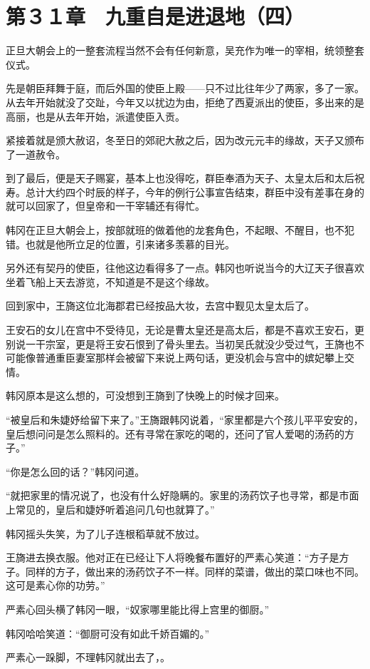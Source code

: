 \section{第３１章　九重自是进退地（四）}

正旦大朝会上的一整套流程当然不会有任何新意，吴充作为唯一的宰相，统领整套仪式。

先是朝臣拜舞于庭，而后外国的使臣上殿——只不过比往年少了两家，多了一家。从去年开始就没了交趾，今年又以扰边为由，拒绝了西夏派出的使臣，多出来的是高丽，也是从去年开始，派遣使臣入贡。

紧接着就是颁大赦诏，冬至日的郊祀大赦之后，因为改元元丰的缘故，天子又颁布了一道赦令。

到了最后，便是天子赐宴，基本上也没得吃，群臣奉酒为天子、太皇太后和太后祝寿。总计大约四个时辰的样子，今年的例行公事宣告结束，群臣中没有差事在身的就可以回家了，但皇帝和一干宰辅还有得忙。

韩冈在正旦大朝会上，按部就班的做着他的龙套角色，不起眼、不醒目，也不犯错。也就是他所立足的位置，引来诸多羡慕的目光。

另外还有契丹的使臣，往他这边看得多了一点。韩冈也听说当今的大辽天子很喜欢坐着飞船上天去游览，不知道是不是这个缘故。

回到家中，王旖这位北海郡君已经按品大妆，去宫中觐见太皇太后了。

王安石的女儿在宫中不受待见，无论是曹太皇还是高太后，都是不喜欢王安石，更别说一干宗室，更是将王安石恨到了骨头里去。当初吴氏就没少受过气，王旖也不可能像普通重臣妻室那样会被留下来说上两句话，更没机会与宫中的嫔妃攀上交情。

韩冈原本是这么想的，可没想到王旖到了快晚上的时候才回来。

“被皇后和朱婕妤给留下来了。”王旖跟韩冈说着，“家里都是六个孩儿平平安安的，皇后想问问是怎么照料的。还有寻常在家吃的喝的，还问了官人爱喝的汤药的方子。”

“你是怎么回的话？”韩冈问道。

“就把家里的情况说了，也没有什么好隐瞒的。家里的汤药饮子也寻常，都是市面上常见的，皇后和婕妤听着追问几句也就算了。”

韩冈摇头失笑，为了儿子连根稻草就不放过。

王旖进去换衣服。他对正在已经让下人将晚餐布置好的严素心笑道：“方子是方子。同样的方子，做出来的汤药饮子不一样。同样的菜谱，做出的菜口味也不同。这可是素心你的功劳。”

严素心回头横了韩冈一眼，“奴家哪里能比得上宫里的御厨。”

韩冈哈哈笑道：“御厨可没有如此千娇百媚的。”

严素心一跺脚，不理韩冈就出去了，。

